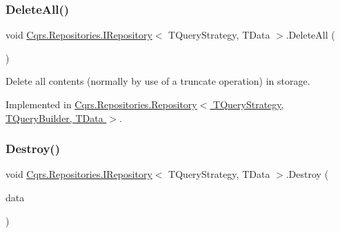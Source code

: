 \mbox{\label{interfaceCqrs_1_1Repositories_1_1IRepository_a0da5f756a0fd184dc51a81741f82734a_a0da5f756a0fd184dc51a81741f82734a}} 
\subsubsection{\texorpdfstring{Delete\+All()}{DeleteAll()}}
{\footnotesize\ttfamily void \hyperlink{interfaceCqrs_1_1Repositories_1_1IRepository}{Cqrs.\+Repositories.\+I\+Repository}$<$ T\+Query\+Strategy, T\+Data $>$.Delete\+All (\begin{DoxyParamCaption}{ }\end{DoxyParamCaption})}



Delete all contents (normally by use of a truncate operation) in storage. 



Implemented in \hyperlink{classCqrs_1_1Repositories_1_1Repository_a6b6b50d476a351fc7fbd194cb8fa44d0_a6b6b50d476a351fc7fbd194cb8fa44d0}{Cqrs.\+Repositories.\+Repository$<$ T\+Query\+Strategy, T\+Query\+Builder, T\+Data $>$}.

\mbox{\label{interfaceCqrs_1_1Repositories_1_1IRepository_a3a7a60be19498813b3822558b88fad66_a3a7a60be19498813b3822558b88fad66}} 
\subsubsection{\texorpdfstring{Destroy()}{Destroy()}}
{\footnotesize\ttfamily void \hyperlink{interfaceCqrs_1_1Repositories_1_1IRepository}{Cqrs.\+Repositories.\+I\+Repository}$<$ T\+Query\+Strategy, T\+Data $>$.Destroy (\begin{DoxyParamCaption}\item[{T\+Data}]{data }\end{DoxyParamCaption})}




